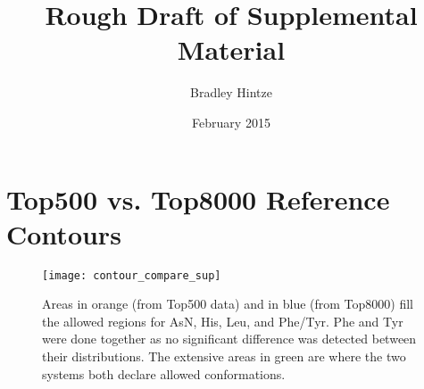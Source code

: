 \documentclass{article}
\begin{document}
\title{Rough Draft of Supplemental Material}
\author{Bradley Hintze}
\date{February 2015}
\maketitle

\tableofcontents
\newpage

\section{Top500 vs. Top8000 Reference Contours}
\begin{figure}[h]
  \centering
  \texttt{[image: contour\_compare\_sup]}
  \caption{Areas in orange (from Top500 data) and in blue (from Top8000) fill
      the allowed regions for AsN, His, Leu, and Phe/Tyr. Phe and Tyr were done
      together as no significant difference was detected between their distributions.
      The extensive areas in green are where the two systems both declare allowed 
      conformations.}
    \label{fig:outcounts}
\end{figure}
\newpage

\newpage

\newpage

\newpage

\newpage
%
\end{document}
